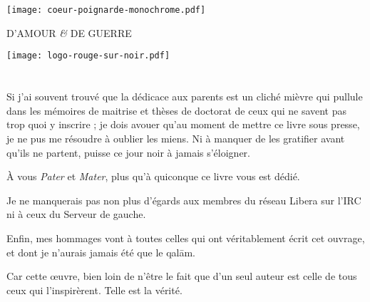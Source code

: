 \documentclass[a5paper,10pt,twoside,french]{book}
\begin{document}
{
\thispagestyle{empty}
\chapter*{}
\thispagestyle{empty}

  \null\vfill           %
    \begin{center}
      \texttt{[image: coeur-poignarde-monochrome.pdf]}
 
      \LARGE {D’AMOUR \emph{\&} DE GUERRE}

      \vspace*{20pt}

      \large { \texttt{[image: logo-rouge-sur-noir.pdf]} }
    \end{center}
    \vspace*{150pt}
  \vfill                %

}
{
\thispagestyle{empty}
\chapter*{}
\thispagestyle{empty}

  \null\vfill           %

    \begin{flushright}
      \begin{minipage}[t]{0.6\textwidth}%
        \em
        \small

        Si j’ai souvent trouvé que la dédicace aux parents est un cliché mièvre qui pullule dans les mémoires de maitrise et thèses de doctorat de ceux qui ne savent pas trop quoi y inscrire ; je dois avouer qu’au moment de mettre ce livre sous presse, je ne pus me résoudre à oublier les miens. Ni à manquer de les gratifier avant qu’ils ne partent, puisse ce jour noir à jamais s’éloigner.

        À vous \emph{Pater} et \emph{Mater}, plus qu’à quiconque ce livre vous est dédié.

        Je ne manquerais pas non plus d’égards aux membres du réseau Libera sur l’IRC ni à ceux du Serveur de gauche.

        Enfin, mes hommages vont à toutes celles qui ont véritablement écrit cet ouvrage, et dont je n’aurais jamais été que le qalām.

        Car cette œuvre, bien loin de n’être le fait que d’un seul auteur est celle de tous ceux qui l’inspirèrent. Telle est la vérité.
      \end{minipage}%
    \end{flushright}

  \null\vfill\null                %
}
\end{document}
